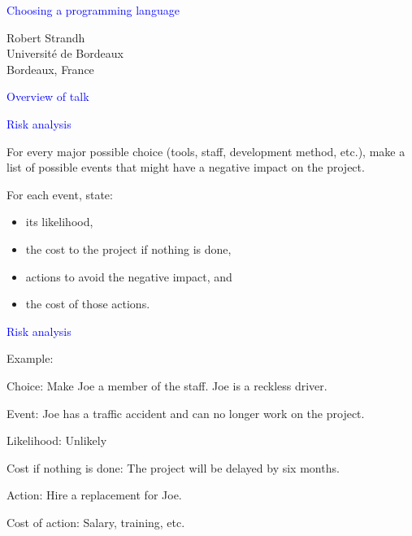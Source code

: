 \documentclass{slides}
\newcommand{\ti}[1]{\begin{center}\Large{\textcolor{blue}{#1}}\end{center}}
\begin{document}
\landscape
\setlength{\oddsidemargin}{1cm}
\setlength{\evensidemargin}{1cm}
\setlength{\marginparwidth}{1cm}
\setlength{\parskip}{0.5cm}
\setlength{\parindent}{0cm}
\begin{slide}\ti{Choosing a programming language}
\vskip 0.5cm
\begin{center}
Robert Strandh \\
Université de Bordeaux \\
Bordeaux, France
\end{center}
\vfill\end{slide}
\begin{slide}\ti{Overview of talk}

\vfill\end{slide}
\begin{slide}\ti{Risk analysis}

For every major possible choice (tools, staff, development method,
etc.), make a list of possible events that might have a negative
impact on the project.

For each event, state:

\begin{itemize}
\item its likelihood,
\item the cost to the project if nothing is done,
\item actions to avoid the negative impact, and
\item the cost of those actions.
\end{itemize}

\vfill\end{slide}
\begin{slide}\ti{Risk analysis}

Example:

Choice: Make Joe a member of the staff.  Joe is a reckless driver.

Event: Joe has a traffic accident and can no longer work on the
project. 

Likelihood: Unlikely

Cost if nothing is done: The project will be delayed by six months. 

Action: Hire a replacement for Joe.

Cost of action: Salary, training, etc.

\vfill\end{slide}
\end{document}
